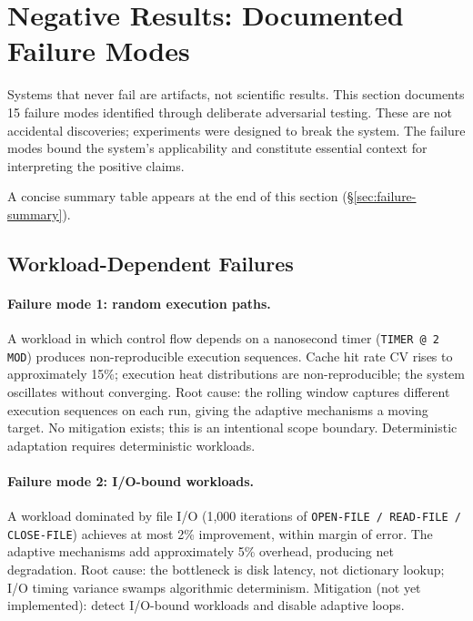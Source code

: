 
\section{Negative Results: Documented Failure Modes}
\label{sec:negative-results}

Systems that never fail are artifacts, not scientific results. This section
documents 15 failure modes identified through deliberate adversarial testing.
These are not accidental discoveries; experiments were designed to break the
system. The failure modes bound the system's applicability and constitute
essential context for interpreting the positive claims.

A concise summary table appears at the end of this section
(\S\ref{sec:failure-summary}).

\subsection{Workload-Dependent Failures}

\paragraph{Failure mode 1: random execution paths.}
A workload in which control flow depends on a nanosecond timer
(\texttt{TIMER @ 2 MOD}) produces non-reproducible execution sequences.
Cache hit rate CV rises to approximately 15\%; execution heat distributions
are non-reproducible; the system oscillates without converging. Root cause:
the rolling window captures different execution sequences on each run, giving
the adaptive mechanisms a moving target. No mitigation exists; this is an
intentional scope boundary. Deterministic adaptation requires deterministic
workloads.

\paragraph{Failure mode 2: I/O-bound workloads.}
A workload dominated by file I/O (1{,}000 iterations of
\texttt{OPEN-FILE~/ READ-FILE / CLOSE-FILE}) achieves at most 2\%
improvement, within margin of error. The adaptive mechanisms add approximately
5\% overhead, producing net degradation. Root cause: the bottleneck is disk
latency, not dictionary lookup; I/O timing variance swamps algorithmic
determinism. Mitigation (not yet implemented): detect I/O-bound workloads
and disable adaptive loops.

